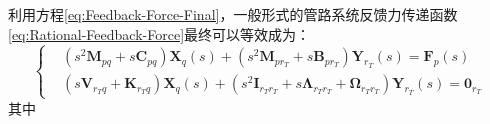 利用方程\eqref{eq:Feedback-Force-Final}，一般形式的管路系统反馈力传递函数\eqref{eq:Rational-Feedback-Force}最终可以等效成为：
\begin{equation}
  \label{eq:Final-Common-Feedback-SVD-Force}
  \left\{
  \begin{aligned}
     & ({s}^{2}{\boldsymbol{M}_{pq}}+s{\boldsymbol{C}_{pq}})\boldsymbol{X}_{q}(s)+({s}^{2}\boldsymbol{M}_{pr_T}+s{\boldsymbol{B}_{pr_T}})\boldsymbol{Y}_{r_T}(s)=\boldsymbol{F}_{p}(s)                            \\
     & (s\boldsymbol{V}_{r_Tq}+\boldsymbol{K}_{r_Tq})\boldsymbol{X}_{q}(s)+(s^2\boldsymbol{I}_{r_Tr_T}+s\boldsymbol{\Lambda}_{r_Tr_T} + \boldsymbol{\Omega}_{r_Tr_T})\boldsymbol{Y}_{r_T}(s)=\boldsymbol{0}_{r_T}
  \end{aligned} \right.
\end{equation}
其中
